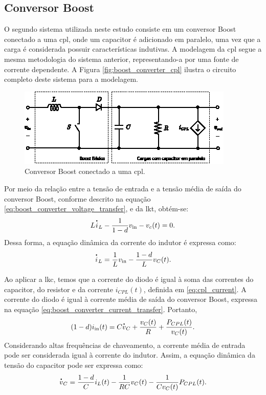 \subsection{Conversor Boost}

O segundo sistema utilizada neste estudo consiste em um conversor Boost conectado a uma \acrshort{cpl}, onde um capacitor é adicionado em paralelo, uma vez que a carga é considerada possuir características indutivas. A modelagem da \acrshort{cpl} segue a mesma metodologia do sistema anterior, representando-a por uma fonte de corrente dependente. A Figura \autoref{fig:boost_converter_cpl} ilustra o circuito completo deste sistema para a modelagem.

\begin{figure}[H]
  \centering
  \includegraphics[width=.73\textwidth]{figuras/boost_converter_cpl.eps}
  \caption{Conversor Boost conectado a uma \acrshort{cpl}.}
  \label{fig:boost_converter_cpl}
\end{figure}

Por meio da relação entre a tensão de entrada e a tensão média de saída do conversor Boost, conforme descrito na equação \eqref{eq:boost_converter_voltage_transfer}, e da \acrshort{lkt}, obtém-se: \begin{equation} L \dt{i}_L - \frac{1}{1-d} v_{\text{in}} - v_c(t) = 0. \end{equation} Dessa forma, a equação dinâmica da corrente do indutor é expressa como: \begin{equation} \dt{i}_L = \frac{1}{L}v_{\text{in}} - \frac{1-d}{L}v_C(t) \label{eq:boost_converter_current}. \end{equation} 

Ao aplicar a \acrshort{lkc}, temos que a corrente do diodo é igual à soma das correntes do capacitor, do resistor e da corrente $i_{CPL}(t)$, definida em \eqref{eq:cpl_current}. A corrente do diodo é igual à corrente média de saída do conversor Boost, expressa na equação \eqref{eq:boost_converter_current_transfer}. Portanto, \begin{equation} (1 - d) i_{\text{in}}(t) = C\dt{v}_C + \frac{v_C(t)}{R} + \frac{P_{CPL}(t)}{v_C(t)}.\end{equation} Considerando altas frequências de chaveamento, a corrente média de entrada pode ser considerada igual à corrente do indutor. Assim, a equação dinâmica da tensão do capacitor pode ser expressa como: \begin{equation} \dt{v}_C = \frac{1 - d}{C} i_L(t) - \frac{1}{RC}v_C(t) - \frac{1}{Cv_C(t)}P_{CPL}(t). \label{eq:boost_converter_voltage}\end{equation}


